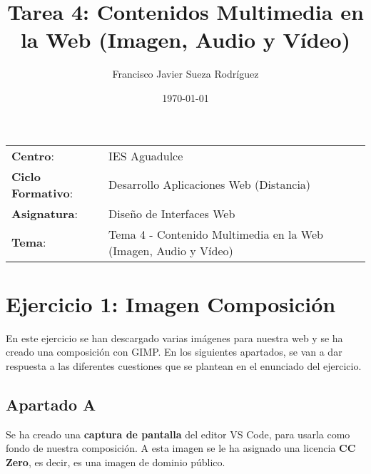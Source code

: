 


\title{
\vspace{10ex}
\normalfont \normalsize
\huge \textbf{Tarea 4: Contenidos Multimedia en la Web (Imagen, Audio y Vídeo)}
}
\author{Francisco Javier Sueza Rodríguez}
\date{\normalsize\today}



\maketitle

\thispagestyle{empty}

\vspace{65ex}

\begin{center}
    \begin{tabular}{l l}
        \textbf{Centro}: & IES Aguadulce \\
        \textbf{Ciclo Formativo}: & Desarrollo Aplicaciones Web (Distancia)\\
        \textbf{Asignatura}: & Diseño de Interfaces Web\\
        \textbf{Tema}: & Tema 4 -  Contenido Multimedia en la Web (Imagen, Audio y Vídeo)\\
    \end{tabular}
\end{center}

\newpage

\tableofcontents

\newpage

\section{Ejercicio 1: Imagen Composición}
En este ejercicio se han descargado varias imágenes para nuestra web y se ha creado una composición con GIMP. En los siguientes apartados, se van a dar respuesta a las diferentes cuestiones que se plantean en el enunciado del ejercicio.

\subsection{Apartado A}
Se ha creado una \textbf{captura de pantalla} del editor VS Code, para usarla como fondo de nuestra composición. A esta imagen se le ha asignado una licencia \textbf{CC Zero}, es decir, es una imagen de dominio público.

